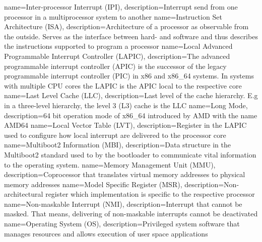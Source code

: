 {
  name=Inter-processor Interrupt (IPI),
  description={Interrupt send from one processor in a multiprocessor system to another}
}
{
  name=Instruction Set Architecture (ISA),
  description={Architecture of a processor as observable from the outside. Serves as the interface between hard- and
  software and thus describes the instructions supported to program a processor}
}
%
{
  name=Local Advanced Programmable Interrupt Controller (LAPIC),
  description={The advanced programmable interrupt controller (APIC) is the successor of the legacy programmable
    interrupt controller (PIC) in x86 and x86\_64 systems. In systems with multiple CPU cores the LAPIC is the
  APIC local to the respective core}
}
{
  name=Last Level Cache (LLC),
  description={Last level of the cache hierarchy. E.g in a three-level hierarchy, the level 3 (L3) cache is the LLC}
}
{
  name=Long Mode,
  description={64 bit operation mode of x86\_64 introduced by AMD with the name AMD64}
}
{
  name=Local Vector Table (LVT),
  description={Register in the LAPIC used to configure how local interrupt are delivered to the processor core}
}
%
{
  name=Multiboot2 Information (MBI),
  description={Data structure in the Multiboot2 standard used to by the bootloader to communicate vital information to
  the operating system.}
}
{
  name=Memory Management Unit (MMU),
  description={Coprocessor that translates virtual memory addresses to physical memory addresses}
}
{
  name=Model Specific Register (MSR),
  description={Non-architectural register which implementation is specific to the respective processor}
}
%
{
  name=Non-maskable Interrupt (NMI),
  description={Interrupt that cannot be masked. That means, delivering of non-maskable interrupts cannot be
  deactivated}
}
%
{
  name=Operating System (OS),
  description={Privileged system software that manages resources and allows execution of user space applications}
}
